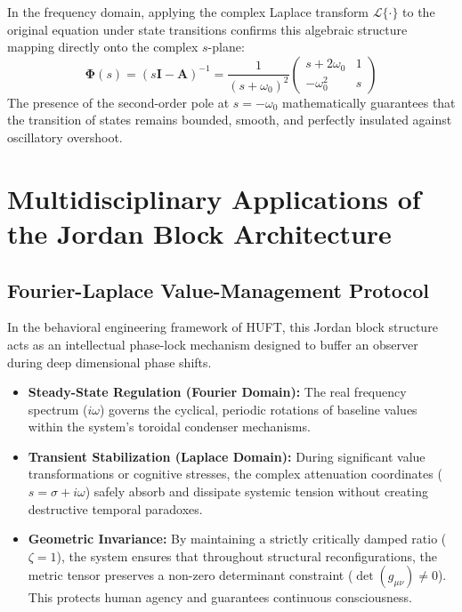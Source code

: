 \documentclass[11pt,preview]{article}
\begin{document}
In the frequency domain, applying the complex Laplace transform $\mathcal{L}\{\cdot\}$ to the original equation under state transitions confirms this algebraic structure mapping directly onto the complex $s$-plane:
\begin{equation}
    \mathbf{\Phi}(s) = (s\mathbf{I} - \mathbf{A})^{-1} = \frac{1}{(s+\omega_0)^2} \begin{pmatrix} s + 2\omega_0 & 1 \\ -\omega_0^2 & s \end{pmatrix}
\end{equation}
The presence of the second-order pole at $s = -\omega_0$ mathematically guarantees that the transition of states remains bounded, smooth, and perfectly insulated against oscillatory overshoot.

\newpage
\appendix
\section{Multidisciplinary Applications of the Jordan Block Architecture}

\subsection{Fourier-Laplace Value-Management Protocol}
In the behavioral engineering framework of HUFT, this Jordan block structure acts as an intellectual phase-lock mechanism designed to buffer an observer during deep dimensional phase shifts. 
\begin{itemize}
    \item \textbf{Steady-State Regulation (Fourier Domain):} The real frequency spectrum ($i\omega$) governs the cyclical, periodic rotations of baseline values within the system's toroidal condenser mechanisms.
    \item \textbf{Transient Stabilization (Laplace Domain):} During significant value transformations or cognitive stresses, the complex attenuation coordinates ($s = \sigma + i\omega$) safely absorb and dissipate systemic tension without creating destructive temporal paradoxes. 
    \item \textbf{Geometric Invariance:} By maintaining a strictly critically damped ratio ($\zeta = 1$), the system ensures that throughout structural reconfigurations, the metric tensor preserves a non-zero determinant constraint ($\det(g_{\mu\nu}) \neq 0$). This protects human agency and guarantees continuous consciousness.
\end{itemize}
\end{document}
